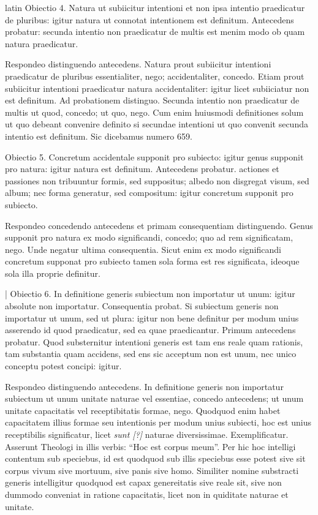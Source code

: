 \begin{otherlanguage*}{latin}
\pstart
  Obiectio 4. Natura ut subiicitur intentioni et non ipsa intentio praedicatur de pluribus: igitur natura ut connotat intentionem est definitum. Antecedens probatur: secunda intentio non praedicatur de multis est menim modo ob quam natura praedicatur. 
\pend

\pstart
  Respondeo distinguendo antecedens. Natura prout subiicitur intentioni praedicatur de pluribus essentialiter, nego; accidentaliter, concedo. Etiam prout subiicitur intentioni praedicatur natura accidentaliter: igitur licet subiiciatur non est definitum. Ad probationem distinguo. Secunda intentio non praedicatur de multis ut quod, concedo; ut quo, nego. Cum enim huiusmodi definitiones solum ut quo debeant convenire definito si secundae intentioni ut quo convenit secunda intentio est definitum. Sic dicebamus numero 659. 
\pend

\pstart
  Obiectio 5. Concretum accidentale supponit pro subiecto: igitur genus supponit pro natura: igitur natura est definitum. Antecedens probatur. actiones et passiones non tribuuntur formis, sed suppositus; albedo non disgregat visum, sed album; nec forma generatur, sed compositum: igitur concretum supponit pro subiecto. 
\pend

\pstart
  Respondeo concedendo antecedens et primam consequentiam distinguendo. Genus supponit pro natura ex modo significandi, concedo; quo ad rem significatam, nego. Unde negatur ultima consequentia. Sicut enim ex modo significandi concretum supponat pro subiecto tamen sola forma est res significata, ideoque sola illa proprie definitur. 
\pend

\pstart
  \textnormal{|}   Obiectio 6. In definitione generis subiectum non importatur ut unum: igitur absolute non importatur. Consequentia probat. Si subiectum generis non importatur ut unum, sed ut plura: igitur non bene definitur per modum unius asserendo id quod praedicatur, sed ea quae praedicantur. Primum antecedens probatur. Quod substernitur intentioni generis est tam ens reale quam rationis, tam substantia quam accidens, sed ens sic acceptum non est unum, nec unico conceptu potest concipi: igitur. 
\pend

\pstart
  Respondeo distinguendo antecedens. In definitione generis non importatur subiectum ut unum unitate naturae vel essentiae, concedo antecedens; ut unum unitate capacitatis vel receptibitatis formae, nego. Quodquod enim habet capacitatem illius formae seu intentionis per modum unius subiecti, hoc est unius receptibilis significatur, licet \emph{sunt [?]} naturae diversissimae. Exemplificatur. Asserunt Theologi in illis verbis: \enquote{Hoc est corpus meum}. Per hic hoc intelligi contentum sub speciebus, id est quodquod sub illis speciebus esse potest sive sit corpus vivum sive mortuum, sive panis sive homo. Similiter nomine substracti generis intelligitur quodquod est capax genereitatis sive reale sit, sive non dummodo conveniat in ratione capacitatis, licet non in quiditate naturae et unitate. 
\pend


\end{otherlanguage*}
